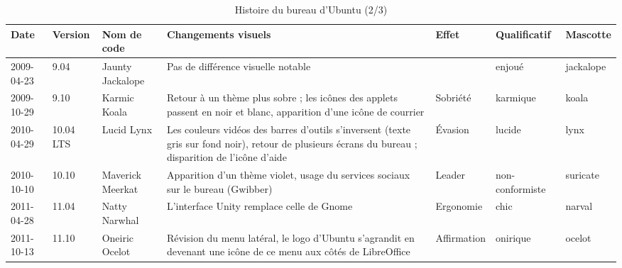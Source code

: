 \documentclass{FramateX}
\begin{document}
\begin{refsection}
\begin{landscape}
\begin{table}
\centering
\begin{scriptsize}
\begin{tabularx}{15cm}{|p{1.5cm}|p{1cm}|p{1.5cm}|X|p{2cm}|p{2cm}|p{1.5cm}|}
\hline
\textbf{Date} &  \textbf{Version}  & \textbf{Nom de code}  & \textbf{Changements visuels}  &  \textbf{Effet}  &  \textbf{Qualificatif}  & \textbf{Mascotte} \\
\hline
 2009-04-23  &  9.04  &  Jaunty Jackalope  & Pas de différence visuelle notable  & ~ & enjoué  & jackalope \\
\hline
 2009-10-29  &  9.10  &  Karmic Koala  & Retour à un thème plus sobre ; les icônes des applets passent en noir et blanc, apparition d'une icône de courrier  &  Sobriété  &  karmique  & koala \\
\hline
 2010-04-29  &  10.04 LTS  &  Lucid Lynx  & Les couleurs vidéos des barres d'outils s'inversent (texte gris sur fond noir), retour de plusieurs écrans du bureau ; disparition de l'icône d'aide  & Évasion  & lucide  & lynx \\
\hline

 2010-10-10  &  10.10  &  Maverick Meerkat  & Apparition d'un thème violet, usage du services sociaux sur le bureau (Gwibber)  &  Leader  & non-conformiste  & suricate \\
\hline
 2011-04-28  &  11.04  &  Natty Narwhal  & L'interface Unity remplace celle de Gnome  &  Ergonomie  &  chic  & narval \\
\hline
 2011-10-13  &  11.10  &  Oneiric Ocelot  & Révision du menu latéral, le logo d'Ubuntu s'agrandit en devenant une icône de ce menu aux côtés de LibreOffice  &
 Affirmation  &  onirique  & ocelot \\
\hline
\end{tabularx}
\end{scriptsize}
\caption{Histoire du bureau d'Ubuntu (2/3)}
\end{table}
\end{landscape}



\end{refsection}
\end{document}
